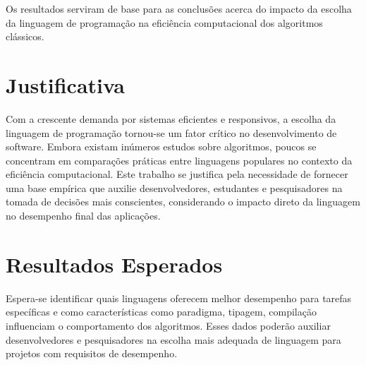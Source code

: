 \documentclass[12pt,oneside,a4paper]{report}
\begin{document}
Os resultados serviram de base para as conclusões acerca do impacto da escolha da linguagem de programação na eficiência computacional dos algoritmos clássicos.


\chapter{Justificativa}
Com a crescente demanda por sistemas eficientes e responsivos, a escolha da linguagem de programação tornou-se um fator crítico no desenvolvimento de software. Embora existam inúmeros estudos sobre algoritmos, poucos se concentram em comparações práticas entre linguagens populares no contexto da eficiência computacional. Este trabalho se justifica pela necessidade de fornecer uma base empírica que auxilie desenvolvedores, estudantes e pesquisadores na tomada de decisões mais conscientes, considerando o impacto direto da linguagem no desempenho final das aplicações.

\chapter{Resultados Esperados}
Espera-se identificar quais linguagens oferecem melhor desempenho para tarefas específicas e como características como paradigma, tipagem, compilação influenciam o comportamento dos algoritmos. Esses dados poderão auxiliar desenvolvedores e pesquisadores na escolha mais adequada de linguagem para projetos com requisitos de desempenho.



\end{document}
